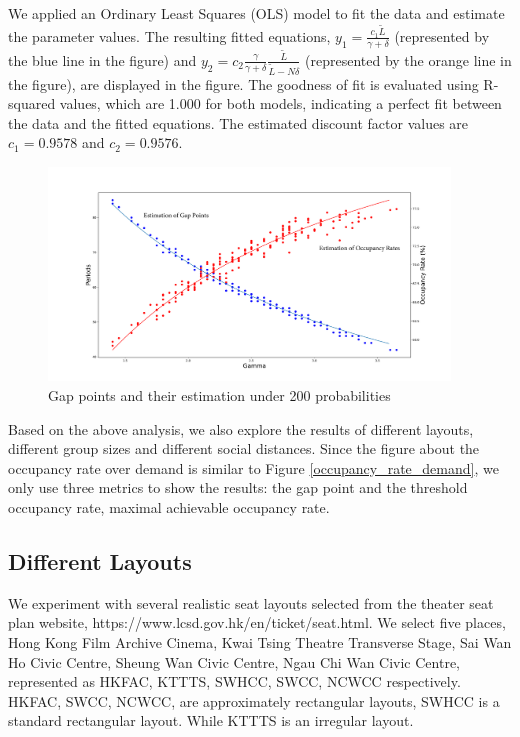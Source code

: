 We applied an Ordinary Least Squares (OLS) model to fit the data and estimate the parameter values. The resulting fitted equations, $y_1 = \frac{c_1 \tilde{L}}{\gamma + \delta}$ (represented by the blue line in the figure) and $y_2 = c_2 \frac{\gamma}{\gamma + \delta} \frac{\tilde{L}}{\tilde{L}-N \delta}$ (represented by the orange line in the figure), are displayed in the figure. The goodness of fit is evaluated using R-squared values, which are 1.000 for both models, indicating a perfect fit between the data and the fitted equations. The estimated discount factor values are $c_1 = 0.9578$ and $c_2 = 0.9576$.

\begin{figure}[ht]
  \centering
    \includegraphics[width=0.95\textwidth]{./Figures/esti_scatter.pdf}
  \caption{Gap points and their estimation under 200 probabilities}
\end{figure}


Based on the above analysis, we also explore the results of different layouts, different group sizes and different social distances. Since the figure about the occupancy rate over demand is similar to Figure \ref{occupancy_rate_demand}, we only use three metrics to show the results: the gap point and the threshold occupancy rate, maximal achievable occupancy rate.

\subsection*{Different Layouts}
We experiment with several realistic seat layouts selected from the theater seat plan website, https://www.lcsd.gov.hk/en/ticket/seat.html. We select five places, Hong Kong Film Archive Cinema, Kwai Tsing Theatre Transverse Stage, Sai Wan Ho Civic Centre, Sheung Wan Civic Centre, Ngau Chi Wan Civic Centre, represented as HKFAC, KTTTS, SWHCC, SWCC, NCWCC respectively. HKFAC, SWCC, NCWCC, are approximately rectangular layouts, SWHCC is a standard rectangular layout. While KTTTS is an irregular layout. 

